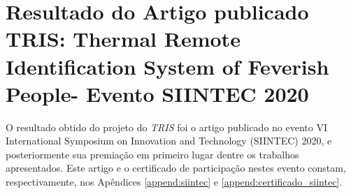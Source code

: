 \section{Resultado do Artigo publicado TRIS: Thermal Remote Identification System of Feverish People- Evento SIINTEC 2020 }
\label{sec:siintec}
O resultado obtido do projeto do \textit{TRIS} foi o artigo publicado no evento VI International Symposium on Innovation and Technology (SIINTEC) 2020, e posteriormente sua premiação em primeiro lugar dentre os trabalhos apresentados. Este artigo e o certificado de participação nestes evento constam, respectivamente, nos Apêndices \ref{append:siintec} e \ref{append:certificado_siintec}.